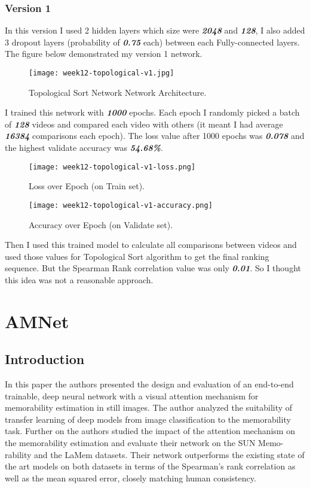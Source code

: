 \subsubsection{Version 1}
In this version I used 2 hidden layers which size were \textbf{\emph{2048}} and \textbf{\emph{128}}, I also added 3 dropout layers (probability of \textbf{\emph{0.75}} each) between each Fully-connected layers. The figure below demonstrated my version 1 network.

\begin{figure}[!ht]
\centering
\texttt{[image: week12-topological-v1.jpg]}
\caption{Topological Sort Network Network Architecture.}
\end{figure}

I trained this network with \textbf{\emph{1000}} epochs. Each epoch I randomly picked a batch of \textbf{\emph{128}} videos and compared each video with others (it meant I had average \textbf{\emph{16384}} comparisons each epoch). The loss value after 1000 epochs was \textbf{\emph{0.078}} and the highest validate accuracy was \textbf{\emph{54.68\%}}.

\begin{figure}[!ht]
\centering
\texttt{[image: week12-topological-v1-loss.png]}
\caption{Loss over Epoch (on Train set).}
\end{figure}

\begin{figure}[!ht]
\centering
\texttt{[image: week12-topological-v1-accuracy.png]}
\caption{Accuracy over Epoch (on Validate set).}
\end{figure}

Then I used this trained model to calculate all comparisons between videos and used those values for Topological Sort algorithm to get the final ranking sequence. But the Spearman Rank correlation value was only \textbf{\emph{0.01}}. So I thought this idea was not a reasonable approach.

\newpage
\section{AMNet}
\subsection{Introduction}
In this paper the authors presented the design and evaluation of an end-to-end trainable, deep neural network with a visual attention mechanism for memorability estimation in still images. The author analyzed the suitability of transfer learning of deep models from image classification to the memorability task. Further on the authors studied the impact of the attention mechanism on the memorability estimation and evaluate their network on the SUN Memo-rability and the LaMem datasets. Their network outperforms the existing state of the art models on both datasets in terms of the Spearman’s rank correlation as well as the mean squared error, closely matching human consistency.

